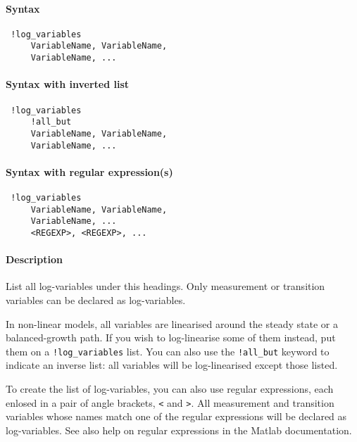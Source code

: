 


	\paragraph{Syntax}
 
 \begin{verbatim}
 !log_variables
     VariableName, VariableName, 
     VariableName, ...
 \end{verbatim}
 
 \paragraph{Syntax with inverted list}
 
 \begin{verbatim}
 !log_variables
     !all_but
     VariableName, VariableName, 
     VariableName, ...
 \end{verbatim}
 
 \paragraph{Syntax with regular expression(s)}
 
 \begin{verbatim}
 !log_variables
     VariableName, VariableName, 
     VariableName, ...
     <REGEXP>, <REGEXP>, ...
 \end{verbatim}
 
 \paragraph{Description}
 
 List all log-variables under this headings. Only measurement or
 transition variables can be declared as log-variables.
 
 In non-linear models, all variables are linearised around the steady
 state or a balanced-growth path. If you wish to log-linearise some of
 them instead, put them on a \texttt{!log\_variables} list. You can also
 use the \texttt{!all\_but} keyword to indicate an inverse list: all
 variables will be log-linearised except those listed.
 
 To create the list of log-variables, you can also use regular
 expressions, each enlosed in a pair of angle brackets,
 \texttt{\textless{}} and \texttt{\textgreater{}}. All measurement and
 transition variables whose names match one of the regular expressions
 will be declared as log-variables. See also help on regular expressions
 in the Matlab documentation.
 
